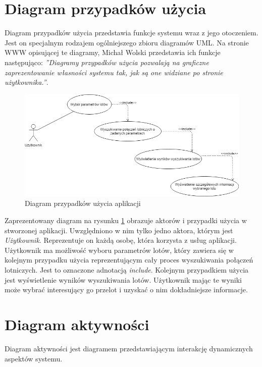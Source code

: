 \documentclass[12pt, twoside]{report}
\begin{document}
\section{Diagram przypadków użycia}
Diagram przypadków użycia przedstawia funkcje systemu wraz z jego otoczeniem. Jest on specjalnym rodzajem ogólniejszego zbioru diagramów UML. Na stronie WWW opisującej te diagramy, Michał Wolski przedstawia ich funkcje następująco: \emph{''Diagramy przypadków użycia pozwalają na graficzne zaprezentowanie własności systemu tak, jak są one widziane po stronie użytkownika.''}.\cite{uml}
\begin{figure}[!ht]
\centering
\includegraphics[scale=0.60, keepaspectratio]{usecase_diagram.png}
\caption{Diagram przypadków użycia aplikacji}
\label{fig:usecase_diagram}
\end{figure}

\noindent Zaprezentowany diagram na rysunku \ref{fig:usecase_diagram} obrazuje aktorów i przypadki użycia w stworzonej aplikacji. Uwzględniono w nim tylko jedno aktora, którym jest \textit{Użytkownik}. Reprezentuje on każdą osobę, która korzysta z usług aplikacji. Użytkownik ma możliwość wyboru parametrów lotów, który zawiera się w kolejnym przypadku użycia reprezentującym cały proces wyszukiwania połączeń lotniczych. Jest to oznaczone adnotacją \textit{include}. Kolejnym przypadkiem użycia jest wyświetlenie wyników wyszukiwania lotów. Użytkownik mając te wyniki może wybrać interesujący go przelot i uzyskać o nim dokładniejsze informacje.
\section{Diagram aktywności} 
Diagram aktywności jest diagramem przedstawiającym interakcję dynamicznych aspektów systemu.\cite{uml}
\end{document}
